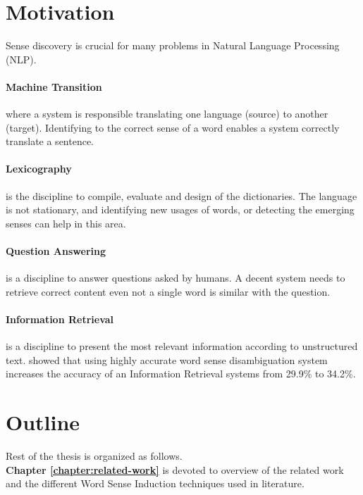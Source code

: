 \section{Motivation}

Sense discovery is crucial for many problems in Natural Language Processing (NLP). 

\paragraph{Machine Transition} where a system is responsible translating one language (source) to another (target). Identifying to the correct sense of a word enables a system correctly translate a sentence.

\paragraph{Lexicography} is the discipline to compile, evaluate and design of the dictionaries. The language is not stationary, and identifying new usages of words, or detecting the emerging senses can help in this area.

\paragraph{Question Answering} is a discipline to answer questions asked by humans. A decent system needs to retrieve correct content even not a single word is similar with the question.

\paragraph{Information Retrieval} is a discipline to present the most relevant information according to unstructured text. \cite{schutze95information} showed that using highly accurate word sense disambiguation system increases the accuracy of an Information Retrieval systems from 29.9\% to
34.2\%.
\section{Outline}

Rest of the thesis is organized as follows. \\




\textbf{Chapter \ref{chapter:related-work}} is devoted to overview of the related work and the different Word Sense Induction techniques used in literature. \\


